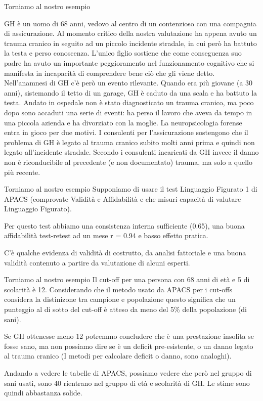\documentclass[
  ignorenonframetext,
]{beamer}
\begin{document}
\begin{frame}{Torniamo al nostro esempio}
\label{torniamo-al-nostro-esempio}
\small

GH è un uomo di 68 anni, vedovo al centro di un contenzioso con una
compagnia di assicurazione. Al momento critico della nostra valutazione
ha appena avuto un trauma cranico in seguito ad un piccolo incidente
stradale, in cui però ha battuto la testa e perso conoscenza. L'unico
figlio sostiene che come conseguenza suo padre ha avuto un importante
peggioramento nel funzionamento cognitivo che si manifesta in incapacità
di comprendere bene ciò che gli viene detto. Nell'anamnesi di GH c'è
però un evento rilevante. Quando era più giovane (a 30 anni), sistemando
il tetto di un garage, GH è caduto da una scala e ha battuto la testa.
Andato in ospedale non è stato diagnosticato un trauma cranico, ma poco
dopo sono accaduti una serie di eventi: ha perso il lavoro che aveva da
tempo in una piccola azienda e ha divorziato con la moglie. La
neuropsicologia forense entra in gioco per due motivi. I consulenti per
l'assicurazione sostengono che il problema di GH è legato al trauma
cranico subito molti anni prima e quindi non legato all'incidente
stradale. Secondo i consulenti incaricati da GH invece il danno non è
riconducibile al precedente (e non documentato) trauma, ma solo a quello
più recente.
\end{frame}

\begin{frame}{Torniamo al nostro esempio}
\label{torniamo-al-nostro-esempio-1}
Supponiamo di usare il test Linguaggio Figurato 1 di APACS (comprovate
Validità e Affidabilità e che misuri capacità di valutare Linguaggio
Figurato).

Per questo test abbiamo una consistenza interna sufficiente (0.65), una
buona affidabilità test-retest ad un mese r = 0.94 e basso effetto
pratica.

C'è qualche evidenza di validità di costrutto, da analisi fattoriale e
una buona validità contenuto a partire da valutazione di alcuni esperti.
\end{frame}

\begin{frame}{Torniamo al nostro esempio}
\label{torniamo-al-nostro-esempio-2}
Il cut-off per una persona con 68 anni di età e 5 di scolarità è 12.
Considerando che il metodo usato da APACS per i cut-offs considera la
distinizone tra campione e popolazione questo significa che un punteggio
al di sotto del cut-off è atteso da meno del 5\% della popolazione (di
sani).

Se GH ottenesse meno 12 potremmo concludere che è una prestazione
insolita se fosse sano, ma non possiamo dire se è un deficit
pre-esistente, o un danno legato al trauma cranico (I metodi per
calcolare deficit o danno, sono analoghi).

Andando a vedere le tabelle di APACS, possiamo vedere che però nel
gruppo di sani usati, sono 40 rientrano nel gruppo di età e scolarità di
GH. Le stime sono quindi abbastanza solide.
\end{frame}
\end{document}
